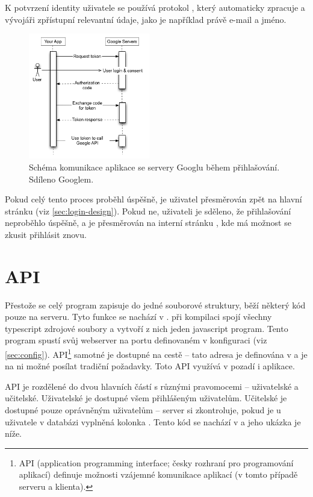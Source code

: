 K potvrzení identity uživatele se používá protokol , který  automaticky zpracuje a vývojáři zpřístupní relevantní údaje, jako je například právě e-mail a jméno.

\begin{figure}[H]
    \centering
    \includegraphics[width=200px]{images/02technologie/google-auth.png}
    \caption{Schéma komunikace aplikace se servery Googlu během přihlašování. Sdíleno Googlem. \cite{google-auth}}
\end{figure}

Pokud celý tento proces proběhl úspěšně, je uživatel přesměrován zpět na hlavní stránku (viz \ref{sec:login-design}). Pokud ne, uživateli je sděleno, že přihlašování neproběhlo úspěšně, a je přesměrován na interní stránku , kde má možnost se zkusit přihlásit znovu.

\section{API}
\label{api}

Přestože se celý program zapisuje do jedné souborové struktury, běží některý kód pouze na serveru. Tyto funkce se nachází v .  při kompilaci spojí všechny typescript zdrojové soubory a vytvoří z nich jeden javascript program. Tento program spustí svůj webserver na portu definovaném v konfiguraci (viz \ref{sec:config}). API\footnote{API (application programming interface; česky rozhraní pro programování aplikací) definuje možnosti vzájemné komunikace aplikací (v tomto případě serveru a klienta).} samotné je dostupné na cestě  -- tato adresa je definována v  a je na ni možné posílat tradiční  požadavky. Toto API využívá v pozadí i aplikace.

API je rozdělené do dvou hlavních částí s různými pravomocemi -- uživatelské a učitelské. Uživatelské je dostupné všem přihlášeným uživatelům. Učitelské je dostupné pouze oprávněným uživatelům -- server si zkontroluje, pokud je u uživatele v databázi vyplněná kolonka . Tento kód se nachází v  a jeho ukázka je níže.

